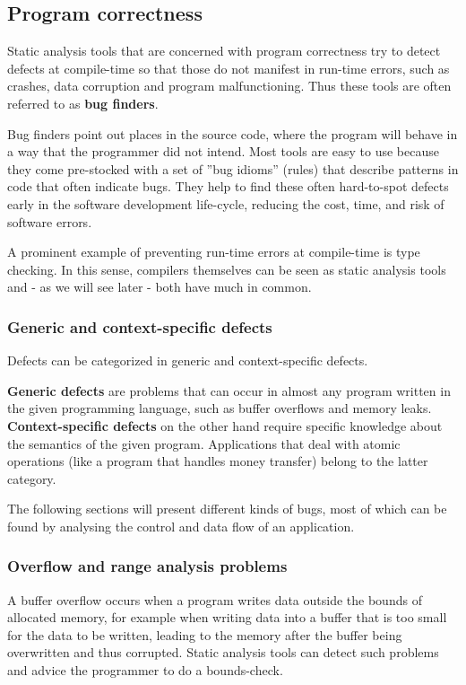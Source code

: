 \subsection{Program correctness}

Static analysis tools that are concerned with program correctness try to detect defects at compile-time so that those do not manifest in run-time errors, such as crashes, data corruption and program malfunctioning. Thus these tools are often referred to as \textbf{bug finders}.

Bug finders point out places in the source code, where the program will behave in a way that the programmer did not intend. Most tools are easy to use because they come pre-stocked with a set of ''bug idioms'' (rules) that describe patterns in code that often indicate bugs. They help to find these often hard-to-spot defects early in the software development life-cycle, reducing the cost, time, and risk of software errors.

A prominent example of preventing run-time errors at compile-time is type checking. In this sense, compilers themselves can be seen as static analysis tools and - as we will see later - both have much in common.

\subsubsection{Generic and context-specific defects}

Defects can be categorized in generic and context-specific defects.

\textbf{Generic defects} are problems that can occur in almost any program written in the given programming language, such as buffer overflows and memory leaks. \textbf{Context-specific defects} on the other hand require specific knowledge about the semantics of the given program. Applications that deal with atomic operations (like a program that handles money transfer) belong to the latter category.

The following sections will present different kinds of bugs, most of which can be found by analysing the control and data flow of an application.

\subsubsection{Overflow and range analysis problems}

A buffer overflow occurs when a program writes data outside the bounds of allocated memory, for example when writing data into a buffer that is too small for the data to be written, leading to the memory after the buffer being overwritten and thus corrupted. Static analysis tools can detect such problems and advice the programmer to do a bounds-check.

